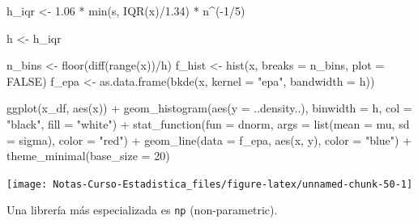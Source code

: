 \documentclass[
  12pt,
]{book}
\newenvironment{Shaded}{\begin{snugshade}}{\end{snugshade}}
\newcommand{\AttributeTok}[1]{\textcolor[rgb]{0.77,0.63,0.00}{#1}}
\newcommand{\ConstantTok}[1]{\textcolor[rgb]{0.00,0.00,0.00}{#1}}
\newcommand{\DecValTok}[1]{\textcolor[rgb]{0.00,0.00,0.81}{#1}}
\newcommand{\FloatTok}[1]{\textcolor[rgb]{0.00,0.00,0.81}{#1}}
\newcommand{\FunctionTok}[1]{\textcolor[rgb]{0.00,0.00,0.00}{#1}}
\newcommand{\NormalTok}[1]{#1}
\newcommand{\OtherTok}[1]{\textcolor[rgb]{0.56,0.35,0.01}{#1}}
\newcommand{\SpecialCharTok}[1]{\textcolor[rgb]{0.00,0.00,0.00}{#1}}
\newcommand{\StringTok}[1]{\textcolor[rgb]{0.31,0.60,0.02}{#1}}
\theoremstyle{definition}
\theoremstyle{definition}
\theoremstyle{definition}
\theoremstyle{remark}
\begin{document}
\begin{Shaded}
\begin{Highlighting}[]
\NormalTok{h\_iqr }\OtherTok{\textless{}{-}} \FloatTok{1.06} \SpecialCharTok{*} \FunctionTok{min}\NormalTok{(s, }\FunctionTok{IQR}\NormalTok{(x)}\SpecialCharTok{/}\FloatTok{1.34}\NormalTok{) }\SpecialCharTok{*}\NormalTok{ n}\SpecialCharTok{\^{}}\NormalTok{(}\SpecialCharTok{{-}}\DecValTok{1}\SpecialCharTok{/}\DecValTok{5}\NormalTok{)}

\NormalTok{h }\OtherTok{\textless{}{-}}\NormalTok{ h\_iqr}

\NormalTok{n\_bins }\OtherTok{\textless{}{-}} \FunctionTok{floor}\NormalTok{(}\FunctionTok{diff}\NormalTok{(}\FunctionTok{range}\NormalTok{(x))}\SpecialCharTok{/}\NormalTok{h)}
\NormalTok{f\_hist }\OtherTok{\textless{}{-}} \FunctionTok{hist}\NormalTok{(x, }\AttributeTok{breaks =}\NormalTok{ n\_bins, }\AttributeTok{plot =} \ConstantTok{FALSE}\NormalTok{)}
\NormalTok{f\_epa }\OtherTok{\textless{}{-}} \FunctionTok{as.data.frame}\NormalTok{(}\FunctionTok{bkde}\NormalTok{(x, }\AttributeTok{kernel =} \StringTok{"epa"}\NormalTok{, }\AttributeTok{bandwidth =}\NormalTok{ h))}

\FunctionTok{ggplot}\NormalTok{(x\_df, }\FunctionTok{aes}\NormalTok{(x)) }\SpecialCharTok{+} \FunctionTok{geom\_histogram}\NormalTok{(}\FunctionTok{aes}\NormalTok{(}\AttributeTok{y =}\NormalTok{ ..density..), }
    \AttributeTok{binwidth =}\NormalTok{ h, }\AttributeTok{col =} \StringTok{"black"}\NormalTok{, }\AttributeTok{fill =} \StringTok{"white"}\NormalTok{) }\SpecialCharTok{+} 
    \FunctionTok{stat\_function}\NormalTok{(}\AttributeTok{fun =}\NormalTok{ dnorm, }\AttributeTok{args =} \FunctionTok{list}\NormalTok{(}\AttributeTok{mean =}\NormalTok{ mu, }
        \AttributeTok{sd =}\NormalTok{ sigma), }\AttributeTok{color =} \StringTok{"red"}\NormalTok{) }\SpecialCharTok{+} \FunctionTok{geom\_line}\NormalTok{(}\AttributeTok{data =}\NormalTok{ f\_epa, }
    \FunctionTok{aes}\NormalTok{(x, y), }\AttributeTok{color =} \StringTok{"blue"}\NormalTok{) }\SpecialCharTok{+} \FunctionTok{theme\_minimal}\NormalTok{(}\AttributeTok{base\_size =} \DecValTok{20}\NormalTok{)}
\end{Highlighting}
\end{Shaded}

\begin{center}\texttt{[image: Notas-Curso-Estadistica\_files/figure-latex/unnamed-chunk-50-1]} \end{center}

Una librería más especializada es \texttt{np} (non-parametric).
\end{document}
